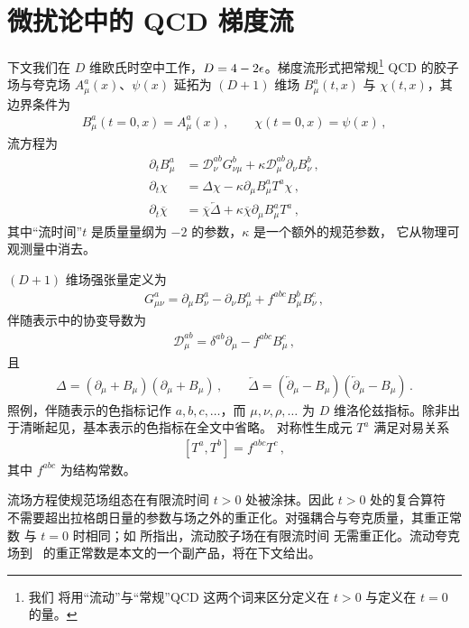 \section{微扰论中的 QCD 梯度流}\label{sec:pert}

下文我们在 $D$ 维欧氏时空中工作，$D=4-2\epsilon$。梯度流形式把常规\footnote{我们
  将用``流动''与``常规''QCD 这两个词来区分定义在 $t>0$ 与定义在 $t=0$ 的量。}
QCD 的胶子场与夸克场 $A^a_\mu(x)$、$\psi(x)$ 延拓为 $(D+1)$ 维场
$B^a_\mu(t,x)$ 与 $\chi(t,x)$，其边界条件为
\begin{equation}
  \begin{split}
    B_\mu^a (t=0,x) = A_\mu^a (x)\,,\qquad \chi (t=0,x)= \psi(x)\,,
    \label{eq:bound}
  \end{split}
\end{equation}
流方程为
\begin{equation}
  \begin{split}
    \partial_t B_\mu^a &= \mathcal{D}^{ab}_\nu G_{\nu\mu}^b + \kappa
    \mathcal{D}^{ab}_\mu \partial_\nu B_\nu^b\,,\\ \partial_t \chi &= \Delta \chi
    - \kappa \partial_\mu B_\mu^a T^a \chi\,,\\ \partial_t \overline
    \chi &= \overline \chi \overleftarrow \Delta + \kappa \overline \chi
    \partial_\mu B_\mu^a T^a\,,
    \label{eq:flow}
  \end{split}
\end{equation}
其中``流时间''$t$ 是质量量纲为 $-2$ 的参数，$\kappa$ 是一个额外的规范参数，
它从物理可观测量中消去。

$(D+1)$ 维场强张量定义为
\begin{align}
  G_{\mu\nu}^a = \partial_\mu B_\nu^a - \partial_\nu B_\mu^a + f^{abc}
  B_\mu^b B_\nu^c\,,
\end{align}
伴随表示中的协变导数为
\begin{align}
  \mathcal{D}_\mu^{ab} = \delta^{ab} \partial_\mu - f^{abc} B_\mu^c\,,
\end{align}
且
\begin{equation}
  \begin{split}
    \Delta = (\partial_\mu + B_\mu) (\partial_\mu + B_\mu)\,,\qquad
    \overleftarrow{\Delta} = (\overleftarrow\partial\!_\mu - B_\mu)
    (\overleftarrow\partial\!_\mu - B_\mu)\,.
  \end{split}
\end{equation}
照例，伴随表示的色指标记作 $a,b,c,\ldots$，而 $\mu,\nu,\rho,\ldots$
为 $D$ 维洛伦兹指标。除非出于清晰起见，基本表示的色指标在全文中省略。
对称性生成元 $T^a$ 满足对易关系
\begin{equation}
  \begin{split}
    [T^a,T^b] = f^{abc}T^c\,,
  \end{split}
\end{equation}
其中 $f^{abc}$ 为结构常数。

流场方程使规范场组态在有限流时间 $t>0$ 处被涂抹。因此 $t>0$ 处的复合算符
不需要超出拉格朗日量的参数与场之外的重正化。对强耦合与夸克质量，其重正常数
与 $t=0$ 时相同；如  所指出，流动胶子场在有限流时间
无需重正化。流动夸克场到 \nnlo\ 的重正常数是本文的一个副产品，将在下文给出。
